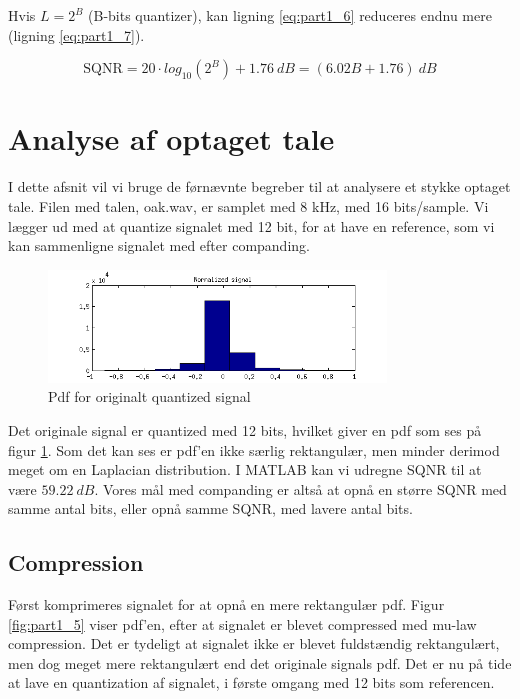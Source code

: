 Hvis $L = 2^B$ (B-bits quantizer), kan ligning \ref{eq:part1_6} reduceres endnu mere (ligning \ref{eq:part1_7}).

\begin{equation}\label{eq:part1_7}
	\text{SQNR} = 20 \cdot log_{10}(2^B) + 1.76\ dB = (6.02 B + 1.76)\ dB
\end{equation}

\section{Analyse af optaget tale}

I dette afsnit vil vi bruge de førnævnte begreber til at analysere et stykke optaget tale. Filen med talen, oak.wav, er samplet med 8 kHz, med 16 bits/sample. Vi lægger ud med at quantize signalet med 12 bit, for at have en reference, som vi kan sammenligne signalet med efter companding. 

 \begin{figure}[!ht]
 	\centering
 	\includegraphics[width=0.8\textwidth]{resources/part1_original}
 	\caption{Pdf for originalt quantized signal}
 	\label{fig:part1_4}
 \end{figure}

 Det originale signal er quantized med 12 bits, hvilket giver en pdf som ses på figur \ref{fig:part1_4}. Som det kan ses er pdf'en ikke særlig rektangulær, men minder derimod meget om en Laplacian distribution. I MATLAB kan vi udregne SQNR til at være $59.22\ dB$. Vores mål med companding er altså at opnå en større SQNR med samme antal bits, eller opnå samme SQNR, med lavere antal bits. 

\subsection{Compression}
Først komprimeres signalet for at opnå en mere rektangulær pdf. Figur \ref{fig:part1_5} viser pdf'en, efter at signalet er blevet compressed med mu-law compression. Det er tydeligt at signalet ikke er blevet fuldstændig rektangulært, men dog meget mere rektangulært end det originale signals pdf. Det er nu på tide at lave en quantization af signalet, i første omgang med 12 bits som referencen.

